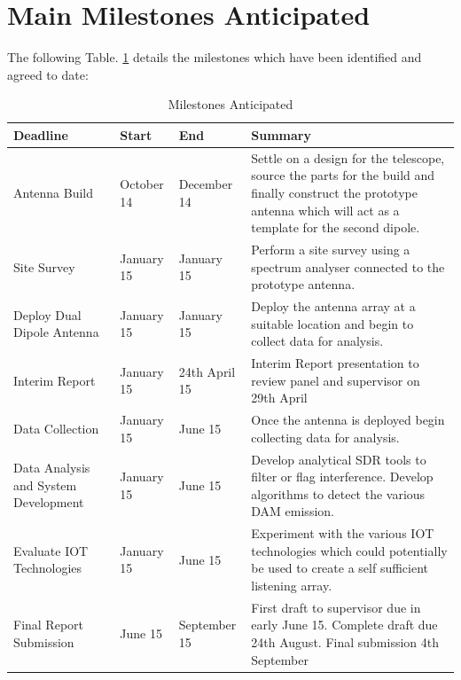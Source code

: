 \documentclass[runningheads,a4paper]{llncs}
\begin{document}

%
%
\newpage
\section*{Main Milestones Anticipated}

The following Table. \ref{tab:milestones_anticipated} details the milestones which have been identified and agreed to date:

%
\begin{table}
  \centering
  \begin{tabular}{ | p{2cm} | p{2cm} | p{2cm} | p{5cm} |}
    \hline
    Deadline & Start & End & Summary \\ \hline
    Antenna Build & October 14 & December 14 & Settle on a design for the telescope, source the parts for the build
    and finally construct the prototype antenna which will act as a template for the second dipole. \\ \hline
    Site Survey & January 15 & January 15 & Perform a site survey using a spectrum analyser connected to the prototype antenna. \\ \hline
    Deploy Dual Dipole Antenna & January 15 & January 15 & Deploy the antenna array at a suitable location and begin to collect data for analysis. \\ \hline
    Interim Report & January 15 & 24th April 15 & Interim Report presentation to review panel and supervisor on 
    29th April \\ \hline
    Data Collection & January 15 & June 15 & Once the antenna is deployed begin collecting data for analysis. \\ \hline
    Data Analysis and System Development & January 15 & June 15 & Develop analytical SDR tools to filter or flag interference. Develop algorithms to detect the various DAM emission. \\ \hline
    Evaluate IOT Technologies & January 15 & June 15 & Experiment with the various IOT technologies which could potentially be used to create a self sufficient listening array. \\ \hline
    Final Report Submission & June 15 & September 15 & First draft to supervisor due in early June 15. Complete draft due 24th August. Final submission 4th September \\
    \hline
  \end{tabular}
  \caption{Milestones Anticipated}
  \label{tab:milestones_anticipated}
\end{table}
%
\end{document}
